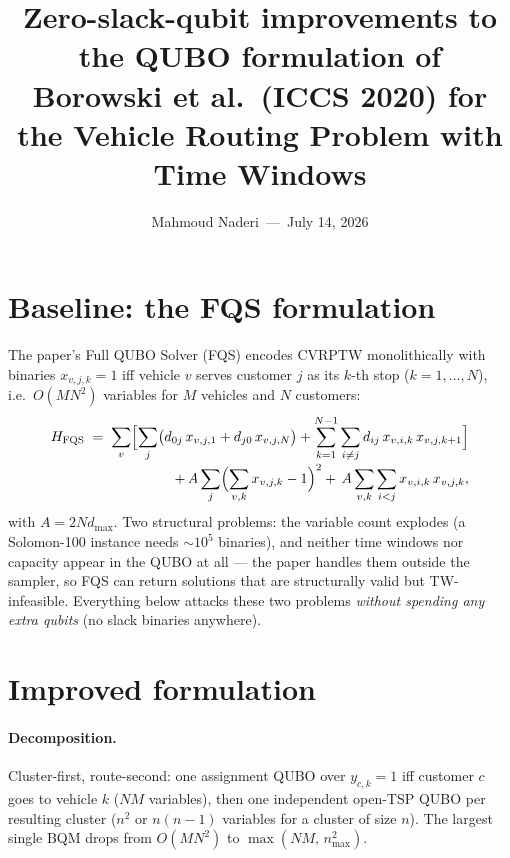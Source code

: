 \documentclass[10pt,a4paper]{article}
\title{\vspace{-1.6cm}\large\textbf{Zero-slack-qubit improvements to the QUBO formulation of\\
Borowski et al.\ (ICCS 2020) for the Vehicle Routing Problem with Time Windows}}
\author{\normalsize Mahmoud Naderi \,---\, July 14, 2026}
\date{}
\begin{document}
\maketitle
\vspace{-1.4cm}

\section{Baseline: the FQS formulation}

The paper's Full QUBO Solver (FQS) encodes CVRPTW monolithically with binaries
$x_{v,j,k}=1$ iff vehicle $v$ serves customer $j$ as its $k$-th stop
($k=1,\dots,N$), i.e.\ $O(MN^2)$ variables for $M$ vehicles and $N$ customers:
\begin{equation}
\begin{split}
H_{\mathrm{FQS}} \;=\;
\sum_{v}\Bigl[\sum_{j} \bigl(d_{0j}\,x_{v,j,1} + d_{j0}\,x_{v,j,N}\bigr)
+ \sum_{k=1}^{N-1}\sum_{i\neq j} d_{ij}\,x_{v,i,k}\,x_{v,j,k+1}\Bigr]\\[-2pt]
+\, A\sum_{j}\Bigl(\sum_{v,k} x_{v,j,k}-1\Bigr)^{2}
+\, A\sum_{v,k}\sum_{i<j} x_{v,i,k}\,x_{v,j,k},
\end{split}
\label{eq:fqs}
\end{equation}
with $A = 2N d_{\max}$. Two structural problems: the variable count explodes
(a Solomon-100 instance needs $\sim$$10^5$ binaries), and neither time windows
nor capacity appear in the QUBO at all --- the paper handles them outside the
sampler, so FQS can return solutions that are structurally valid but
TW-infeasible. Everything below attacks these two problems \emph{without
spending any extra qubits} (no slack binaries anywhere).

\section{Improved formulation}

\paragraph{Decomposition.} Cluster-first, route-second: one assignment QUBO
over $y_{c,k}=1$ iff customer $c$ goes to vehicle $k$ ($NM$ variables), then
one independent open-TSP QUBO per resulting cluster ($n^2$ or $n(n-1)$
variables for a cluster of size $n$). The largest single BQM drops from
$O(MN^2)$ to $\max(NM,\,n_{\max}^2)$.
\end{document}
